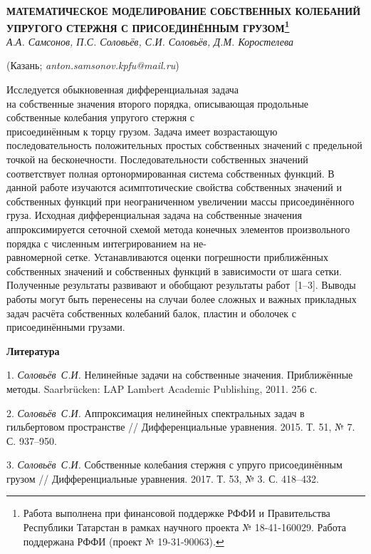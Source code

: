 \begin{center}
    {\bf МАТЕМАТИЧЕСКОЕ МОДЕЛИРОВАНИЕ СОБСТВЕННЫХ КОЛЕБАНИЙ УПРУГОГО СТЕРЖНЯ С ПРИСОЕДИНЁННЫМ ГРУЗОМ\footnote{Работа выполнена при финансовой поддержке РФФИ и Правительства Республики Татарстан в рамках научного проекта № 18-41-160029.
Работа поддержана РФФИ (проект № 19-31-90063).}}\\

    {\it А.А. Самсонов, П.С. Соловьёв, С.И. Соловьёв, Д.М. Коростелева}

    (Казань; {\it anton.samsonov.kpfu@mail.ru})
\end{center}



Исследуется обыкновенная дифференциальная задача
\\на собственные значения второго порядка,
описывающая продольные собственные колебания упругого стержня с
\\присоединённым к торцу грузом.
Задача имеет возрастающую последовательность положительных простых собственных значений
с предельной точкой на бесконечности.
Последовательности собственных значений соответствует полная ортонормированная система
собственных функций.
В данной работе изучаются асимптотические свойства собственных значений и собственных функций
при неограниченном увеличении
массы присоединённого груза.
Исходная дифференциальная задача на собственные значения аппроксимируется
сеточной схемой метода конечных элементов произвольного порядка с численным интегрированием на не-\\равномерной сетке.
Устанавливаются оценки погрешности приближённых собственных значений
и собственных функций в зависимости от шага сетки.
Полученные результаты развивают и обобщают результаты работ~[1--3].
Выводы работы могут быть перенесены на случаи
более сложных и важных прикладных задач расчёта собственных колебаний балок, пластин и оболочек
с присоединёнными грузами.



\smallskip \centerline {\bf Литература} \nopagebreak

1. {\it Соловьёв~С.И.}
Нелинейные задачи на собственные значения. Приближённые методы.
Saarbr\"ucken: LAP Lambert Academic Publishing, 2011. 256 с.

2. {\it Соловьёв~С.И.}
Аппроксимация нелинейных спектральных задач в гильбертовом пространстве
// Дифференциальные уравнения. 2015. Т. 51,
№ 7. С. 937--950.

3. {\it Соловьёв~С.И.}
Собственные колебания стержня с упруго присоединённым грузом
// Дифференциальные уравнения. 2017. Т. 53,
№ 3. С. 418--432.
